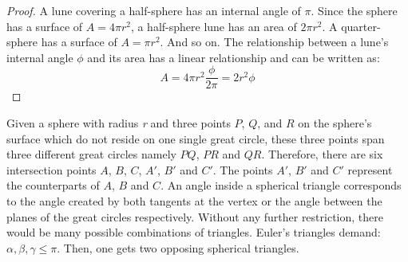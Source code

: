 \begin{proof}
    A lune covering a half-sphere has an internal angle of $\pi$.
    Since the sphere has a surface of $A=4 \pi r^2$, a half-sphere lune has an area of $2 \pi r^2$.
    A quarter-sphere has a surface of $A=\pi r^2$. And so on.
    The relationship between a lune's internal angle $\phi$ and its area has a linear relationship
    and can be written as:
    \begin{equation}
        A = 4 \pi r^2 \frac{\phi}{2\pi} = 2 r^2 \phi
    \end{equation}
\end{proof}

\begin{definition}
    Given a sphere with radius \emph{r} and three points $P$, $Q$, and $R$ on the sphere's surface 
    which do not reside on one single great circle, these three points span three 
    different great circles namely $PQ$, $PR$ and $QR$.
    Therefore, there are six intersection points $A$, $B$, $C$, $A'$, $B'$ and $C'$.
    The points $A'$, $B'$ and $C'$ represent the counterparts of $A$, $B$ and $C$.
    An angle inside a spherical triangle corresponds to the angle created by both tangents 
    at the vertex or the angle between the planes of the great circles respectively.
    Without any further restriction, there would be many possible combinations of triangles.
    Euler's triangles demand: $\alpha, \beta, \gamma \le \pi$.
    Then, one gets two opposing spherical triangles.
\end{definition}
